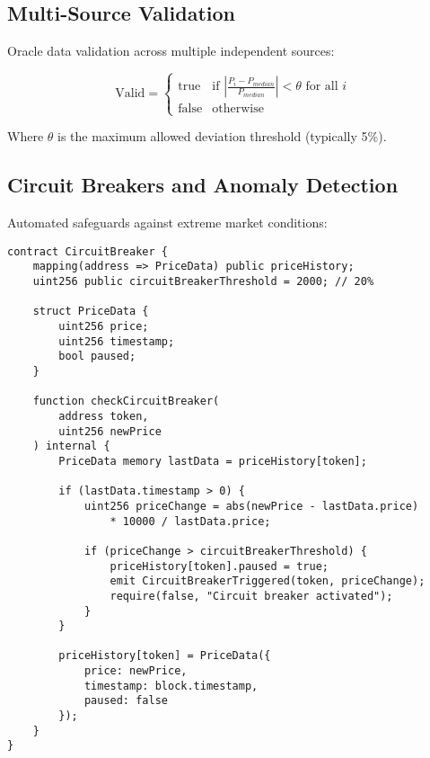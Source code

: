 \documentclass[11pt]{article}
\begin{document}
\subsection{Multi-Source Validation}

Oracle data validation across multiple independent sources:

\begin{equation}
\text{Valid} = \begin{cases}
    \text{true} & \text{if } |\frac{P_i - P_{median}}{P_{median}}| < \theta \text{ for all } i \\
    \text{false} & \text{otherwise}
\end{cases}
\end{equation}

Where $\theta$ is the maximum allowed deviation threshold (typically 5\%).

\subsection{Circuit Breakers and Anomaly Detection}

Automated safeguards against extreme market conditions:

\begin{lstlisting}[caption={Circuit Breaker Implementation}]
contract CircuitBreaker {
    mapping(address => PriceData) public priceHistory;
    uint256 public circuitBreakerThreshold = 2000; // 20%
    
    struct PriceData {
        uint256 price;
        uint256 timestamp;
        bool paused;
    }
    
    function checkCircuitBreaker(
        address token,
        uint256 newPrice
    ) internal {
        PriceData memory lastData = priceHistory[token];
        
        if (lastData.timestamp > 0) {
            uint256 priceChange = abs(newPrice - lastData.price) 
                * 10000 / lastData.price;
                
            if (priceChange > circuitBreakerThreshold) {
                priceHistory[token].paused = true;
                emit CircuitBreakerTriggered(token, priceChange);
                require(false, "Circuit breaker activated");
            }
        }
        
        priceHistory[token] = PriceData({
            price: newPrice,
            timestamp: block.timestamp,
            paused: false
        });
    }
}
\end{lstlisting}
\end{document}
